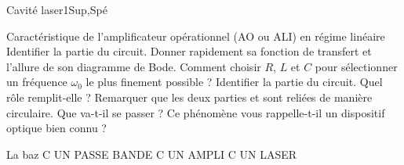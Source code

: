 \begin{exercise}{Cavité laser}{1}{Sup,Spé}
\begin{questions}
    \questioncours Caractéristique de l'amplificateur opérationnel (AO ou ALI) en régime linéaire
    \question Identifier la partie  du circuit. Donner rapidement sa fonction de transfert et l'allure de son diagramme de Bode. Comment choisir $R$, $L$ et $C$ pour sélectionner un fréquence $\omega_0$ le plus finement possible ?
    \question Identifier la partie  du circuit. Quel rôle remplit-elle ?
    \question Remarquer que les deux parties  et  sont reliées de manière circulaire. Que va-t-il se passer ? Ce phénomène vous rappelle-t-il un dispositif optique bien connu ?
\end{questions}
\end{exercise}

\begin{solution}

\begin{questions}
    \questioncours La baz
    \question C UN PASSE BANDE
    \question C UN AMPLI
    \question C UN LASER
\end{questions}

\end{solution}

